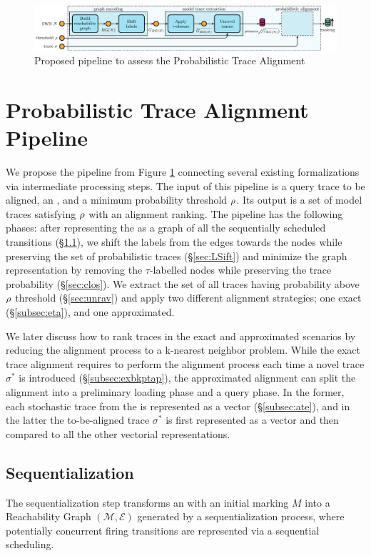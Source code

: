 \begin{figure}[!t]
	\hspace*{-1cm}\includegraphics[width=1.2\textwidth]{images/pipeline}
	\caption{Proposed pipeline to assess the Probabilistic Trace Alignment}\label{fig:pipe}
\end{figure}


\section{Probabilistic Trace Alignment Pipeline}
We propose the pipeline from Figure \ref{fig:pipe} connecting several existing formalizations via intermediate processing steps.
The input of this pipeline is a query trace to be aligned, an \uswn, and a minimum probability threshold $\rho$. Its output
is a set of model traces satisfying $\rho$ with an alignment ranking.
%
The pipeline has the following phases: after representing the \uswn as a graph of all the sequentially scheduled transitions
(\S\ref{sec:seqZ}), we shift the labels from the edges towards the nodes while preserving the set of probabilistic traces
(\S\ref{sec:LSift}) and minimize the graph representation by removing the $\tau$-labelled nodes while preserving the
trace probability (\S\ref{sec:clos}). We extract the set of all traces having probability above $\rho$ threshold (\S\ref{sec:unrav}) and  apply two different alignment strategies; one exact  (\S\ref{subsec:eta}), and one approximated.


We later discuss how to rank traces in the exact and approximated scenarios by reducing the alignment process to a k-nearest
neighbor problem. While the exact trace alignment requires to perform the alignment process each time a novel trace $\sigma^*$ is
introduced (\S\ref{subsec:exbkptap}), the approximated alignment can split the alignment into a preliminary loading phase and a
query phase. In the former, each stochastic trace from the \uswn is represented as a vector (\S\ref{subsec:ate}), and in the latter the to-be-aligned trace $\sigma^*$ is first represented as a vector and then compared to all the other vectorial representations.

\subsection{Sequentialization}\label{sec:seqZ}
The sequentialization step transforms an \uswn with an initial marking $M$ into a Reachability Graph $(\mathcal{M},\mathcal{E})$
generated by a sequentialization process, where potentially concurrent firing transitions are represented via a sequential scheduling.

